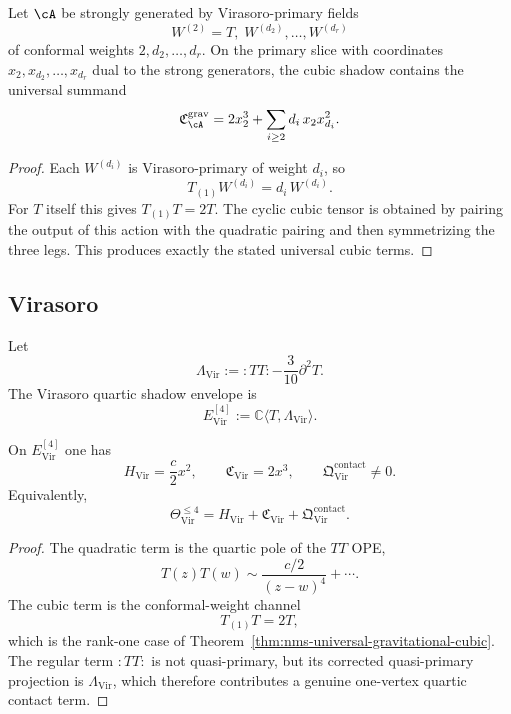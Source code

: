 \begin{theorem}
\label{thm:nms-universal-gravitational-cubic}
Let $\cA$ be strongly generated by Virasoro-primary fields
\[
W^{(2)}=T,\;W^{(d_2)},\dots,W^{(d_r)}
\]
of conformal weights $2,d_2,\dots,d_r$. On the primary slice with coordinates $x_2,x_{d_2},\dots,x_{d_r}$ dual to the strong generators, the cubic shadow contains the universal summand
\begin{equation}
\label{eq:nms-universal-gravitational-cubic}
\mathfrak C^{\mathrm{grav}}_{\cA}
=
2x_2^3+\sum_{i\ge 2} d_i\,x_2x_{d_i}^2.
\end{equation}
\end{theorem}

\begin{proof}
Each $W^{(d_i)}$ is Virasoro-primary of weight $d_i$, so
\[
T_{(1)}W^{(d_i)}=d_i\,W^{(d_i)}.
\]
For $T$ itself this gives $T_{(1)}T=2T$. The cyclic cubic tensor is obtained by pairing the output of this action with the quadratic pairing and then symmetrizing the three legs. This produces exactly the stated universal cubic terms.\qedhere
\end{proof}

\subsection{Virasoro}
\label{subsec:nms-virasoro}

\begin{definition}
\label{def:nms-virasoro-envelope}
Let
\[
\Lambda_{\mathrm{Vir}}:=:TT:-\frac{3}{10}\partial^2T.
\]
The Virasoro quartic shadow envelope is
\[
E^{[4]}_{\mathrm{Vir}}:=\mathbb C\langle T,\Lambda_{\mathrm{Vir}}\rangle.
\]
\end{definition}

\begin{theorem}
\label{thm:nms-virasoro-mixed-shadow}
On $E^{[4]}_{\mathrm{Vir}}$ one has
\[
H_{\mathrm{Vir}}=\frac{c}{2}x^2,
\qquad
\mathfrak C_{\mathrm{Vir}}=2x^3,
\qquad
\mathfrak Q^{\mathrm{contact}}_{\mathrm{Vir}}\neq 0.
\]
Equivalently,
\[
\Theta_{\mathrm{Vir}}^{\le 4}=H_{\mathrm{Vir}}+\mathfrak C_{\mathrm{Vir}}+\mathfrak Q^{\mathrm{contact}}_{\mathrm{Vir}}.
\]
\end{theorem}

\begin{proof}
The quadratic term is the quartic pole of the $TT$ OPE,
\[
T(z)T(w)\sim \frac{c/2}{(z-w)^4}+\cdots.
\]
The cubic term is the conformal-weight channel
\[
T_{(1)}T=2T,
\]
which is the rank-one case of Theorem~\ref{thm:nms-universal-gravitational-cubic}. The regular term $:TT:$ is not quasi-primary, but its corrected quasi-primary projection is $\Lambda_{\mathrm{Vir}}$, which therefore contributes a genuine one-vertex quartic contact term.\qedhere
\end{proof}

